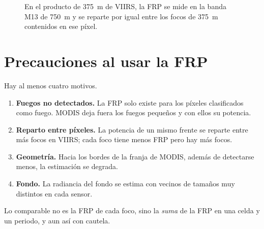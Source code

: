 \begin{figure}[ht]
\centering
{}
\caption{En el producto de 375~m de VIIRS, la FRP se mide en la banda M13 de 750~m y se reparte
por igual entre los focos de 375~m contenidos en ese píxel.}
\label{fig:m13}
\end{figure}

\section{Precauciones al usar la FRP}

\begin{atencion}
Hay al menos cuatro motivos.
\begin{enumerate}
  \item \textbf{Fuegos no detectados.} La FRP solo existe para los píxeles clasificados como
  fuego. MODIS deja fuera los fuegos pequeños y con ellos su potencia.
  \item \textbf{Reparto entre píxeles.} La potencia de un mismo frente se reparte entre más
  focos en VIIRS; cada foco tiene menos FRP pero hay más focos.
  \item \textbf{Geometría.} Hacia los bordes de la franja de MODIS, además de detectarse menos,
  la estimación se degrada.
  \item \textbf{Fondo.} La radiancia del fondo se estima con vecinos de tamaños muy distintos
  en cada sensor.
\end{enumerate}
Lo comparable no es la FRP de cada foco, sino la \emph{suma} de la FRP en una celda y un
periodo, y aun así con cautela.
\end{atencion}

